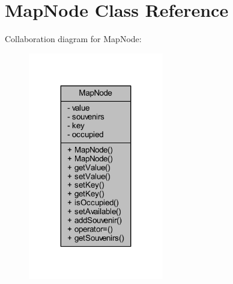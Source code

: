 \hypertarget{class_map_node}{}\section{Map\+Node Class Reference}
\label{class_map_node}


Collaboration diagram for Map\+Node\+:
\nopagebreak
\begin{figure}[H]
\begin{center}
\leavevmode
\includegraphics[width=167pt]{class_map_node__coll__graph}
\end{center}
\end{figure}

